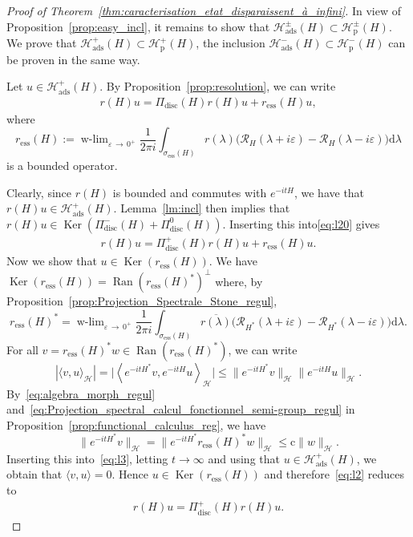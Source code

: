 \documentclass[AHL,Unicode,longabstracts,published]{cedram}
\newcommand{\Hi}{\mathcal{H}}
\newcommand{\ess}{\mathrm{ess}}
\newcommand{\rmp}{\mathrm{p}}
\newcommand{\ads}{\mathrm{ads}}
\newcommand{\rmc}{\mathrm{c}}
\newcommand{\rmd}{\mathrm{d}}
\newcommand{\disc}{\mathrm{disc}}
\newcommand{\Res}{\mathcal{R}}
\DeclareMathOperator{\wlim}{w-lim}
\DeclareMathOperator{\Ran}{Ran}
\DeclareMathOperator{\Ker}{Ker}
\newcommand{\Hi}{\mathcal{H}}
\newcommand{\rmp}{\mathrm{p}}
\newcommand{\ess}{\mathrm{ess}}
\begin{document}
\begin{proof}[Proof of Theorem~\ref{thm:caracterisation_etat_disparaissent_à_infini}]
In view of Proposition~\ref{prop:easy_incl}, it remains to show that $\Hi_\ads^\pm(H)\subset\Hi_\rmp^\pm(H)$. We prove that $\Hi_\ads^+(H)\subset\Hi_\rmp^+(H)$, the inclusion $\Hi_\ads^-(H)\subset\Hi_\rmp^-(H)$ can be proven in the same way.


Let $u\in\Hi_\ads^+(H)$. By Proposition~\ref{prop:resolution}, we can write
\begin{align}\label{eq:l20}
r(H) u = \Pi_{\disc}(H)r(H)u + r_{\ess}(H)u,
\end{align}
where
\begin{equation*}
r_{\ess}(H):=\wlim_{\varepsilon\,\rightarrow\,0^+}\frac{1}{2\pi i}\int_{\sigma_{\ess}(H)}r(\lambda)\big(\Res_{H}(\lambda+i\varepsilon)-\Res_{H}(\lambda-i\varepsilon)\big)\rmd \lambda
\end{equation*}
is a bounded operator.

Clearly, since $r(H)$ is bounded and commutes with $e^{-itH}$, we have that $r(H)u\in\Hi_\ads^+(H)$. Lemma~\ref{lm:incl} then implies that $r(H)u\in\Ker(\Pi_{\disc}^-(H)+\Pi_{\disc}^0(H))$. Inserting this into\eqref{eq:l20} gives
\begin{align}\label{eq:l2}
r(H) u = \Pi_{\disc}^+(H)r(H)u + r_{\ess}(H)u.
\end{align}
Now we show that $u\in\Ker(r_{\ess}(H))$. We have $\Ker(r_{\ess}(H))=\Ran(r_{\ess}(H)^*)^\perp$ where, by Proposition~\ref{prop:Projection_Spectrale_Stone_regul},
\begin{equation*}
r_{\ess}(H)^*=\wlim_{\varepsilon\,\rightarrow\,0^+}\frac{1}{2\pi i}\int_{\sigma_{\ess}(H)}\overline{r(\lambda)}\big(\Res_{H^*}(\lambda+i\varepsilon)-\Res_{H^*}(\lambda-i\varepsilon)\big)\rmd \lambda.
\end{equation*}
For all $v=r_{\ess}(H)^*w\in \Ran(r_{\ess}(H)^*)$, we can write
\begin{equation}\label{eq:l3}
|\langle v,u\rangle_\Hi|=\big|\left\langle e^{-itH^*}v,e^{-itH}u\right\rangle_\Hi\big|\le\big\|e^{-itH^*}v\big\|_\Hi\big\|e^{-itH}u\big\|_\Hi.
\end{equation}
By~\eqref{eq:algebra_morph_regul} and~\eqref{eq:Projection_spectral_calcul_fonctionnel_semi-group_regul} in Proposition~\ref{prop:functional_calculus_reg}, we have
\begin{equation*}
\big\|e^{-itH^*}v\big\|_\Hi=\big\|e^{-itH^*}r_{\ess}(H)^*w\big\|_\Hi\le\rmc\|w\|_\Hi.
\end{equation*}
Inserting this into~\eqref{eq:l3}, letting $t\to\infty$ and using that $u\in\Hi_\ads^+(H)$, we obtain that $\langle v,u\rangle=0$. Hence $u\in\Ker(r_{\ess}(H))$ and therefore~\eqref{eq:l2} reduces to
\begin{align}\label{eq:l4}
r(H) u = \Pi_{\disc}^+(H)r(H)u.
\end{align}


\end{proof}
\end{document}
